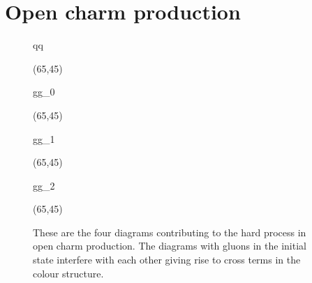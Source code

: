 \clearpage
\chapter{Open charm production}
\label{cha:opencc}

\begin{figure}[t]
	\centering
	\begin{fmffile}{qq}
		\begin{fmfgraph*}(65,45)
		\end{fmfgraph*}
	\end{fmffile}
	\hspace{0.2em}
	\raisebox{1.5em}{,}
	\hspace{0.2em}
	\begin{fmffile}{gg_0}
		\begin{fmfgraph*}(65,45)
		\end{fmfgraph*}
	\end{fmffile}
	\hspace{0.1em}
	\raisebox{1.5em}{$+$}
	\hspace{0.1em}
	\begin{fmffile}{gg_1}
		\begin{fmfgraph*}(65,45)
		\end{fmfgraph*}
	\end{fmffile}
	\hspace{0.1em}
	\raisebox{1.5em}{$+$}
	\hspace{0.1em}
	\begin{fmffile}{gg_2}
		\begin{fmfgraph*}(65,45)
		\end{fmfgraph*}
	\end{fmffile}
	\vspace{1em}
	\caption[Diagrams contributing to open charm production at the partonic level]%
		{These are the four diagrams contributing to the hard process in open charm production.
		The diagrams with gluons in the initial state interfere with each other giving rise to %
		cross terms in the colour structure.}
	\label{fig:parton}
\end{figure}

